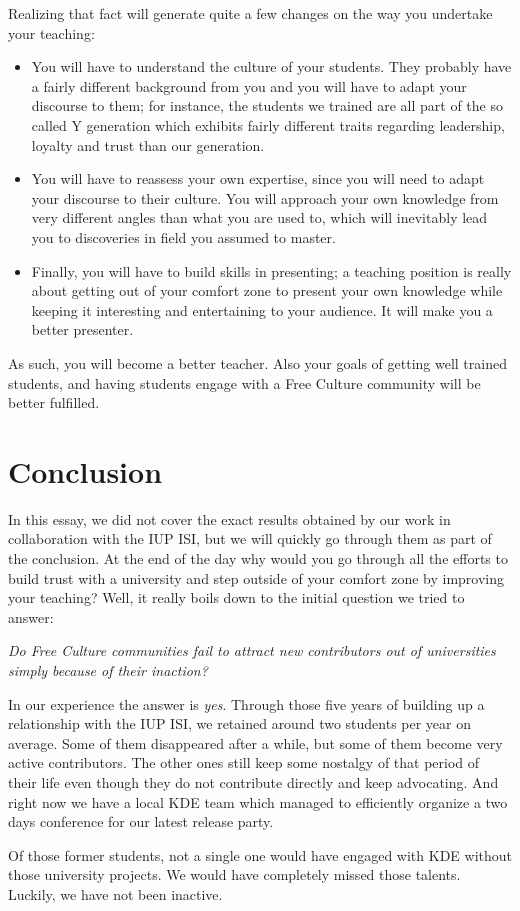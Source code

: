 Realizing that fact will generate quite a few changes on the way you undertake your teaching:
\begin{itemize}
  \item You will have to understand the culture of your students. They probably have a fairly different background from you and you will have to adapt your discourse to them; for instance, the students we trained are all part of the so called Y generation which exhibits fairly different traits regarding leadership, loyalty and trust than our generation.
  \item You will have to reassess your own expertise, since you will need to adapt your discourse to their culture. You will approach your own knowledge from very different angles than what you are used to, which will inevitably lead you to discoveries in field you assumed to master.
  \item Finally, you will have to build skills in presenting; a teaching position is really about getting out of your comfort zone to present your own knowledge while keeping it interesting and entertaining to your audience. It will make you a better presenter.
\end{itemize}

As such, you will become a better teacher. Also your goals of getting well trained students, and having students engage with a Free Culture community will be better fulfilled.

\section*{Conclusion}
In this essay, we did not cover the exact results obtained by our work in collaboration with the IUP ISI, but we will quickly go through them as part of the conclusion. At the end of the day why would you go through all the efforts to build trust with a university and step outside of your comfort zone by improving your teaching? Well, it really boils down to the initial question we tried to answer:

\emph{Do Free Culture communities fail to attract new contributors out of universities simply because of their inaction?}

In our experience the answer is \emph{yes}. Through those five years of building up a relationship with the IUP ISI, we retained around two students per year on average. Some of them disappeared after a while, but some of them become very active contributors. The other ones still keep some nostalgy of that period of their life even though they do not contribute directly and keep advocating. And right now we have a local KDE team which managed to efficiently organize a two days conference for our latest release party.

Of those former students, not a single one would have engaged with KDE without those university projects. We would have completely missed those talents. Luckily, we have not been inactive.
